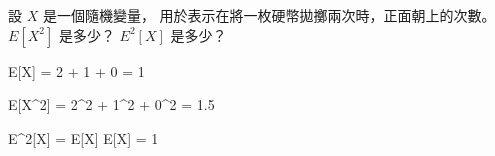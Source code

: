 
\startEXERCISE
設 $X$ 是一個隨機變量，
用於表示在將一枚硬幣拋擲兩次時，正面朝上的次數。
 $E[X^2]$ 是多少？
 $E^2[X]$ 是多少？
\stopEXERCISE

\startANSWER
\startformula
E[X] = 2 \cdot {} + 1 \cdot {} + 0 \cdot {} = 1
\stopformula

\startformula
E[X^2] = 2^2 \cdot {} + 1^2 \cdot {} + 0^2\cdot {} = 1.5
\stopformula

\startformula
E^2[X] = E[X] \cdot E[X] = 1
\stopformula
\stopANSWER
